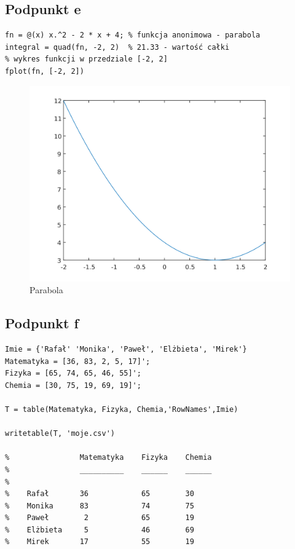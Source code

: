 \documentclass[a4paper, 12pt, titlepage]{article}
\begin{document}
        \subsection{Podpunkt e}
\begin{lstlisting}
fn = @(x) x.^2 - 2 * x + 4; % funkcja anonimowa - parabola
integral = quad(fn, -2, 2)  % 21.33 - wartość całki
% wykres funkcji w przedziale [-2, 2]
fplot(fn, [-2, 2])          
\end{lstlisting}
            \begin{figure}[H]
                \centering
                \includegraphics[width=0.8\columnwidth]{parabola.png}
                \caption{Parabola}
            \end{figure}\noindent

        \subsection{Podpunkt f}
\begin{lstlisting}
Imie = {'Rafał' 'Monika', 'Paweł', 'Elżbieta', 'Mirek'}
Matematyka = [36, 83, 2, 5, 17]';       
Fizyka = [65, 74, 65, 46, 55]';
Chemia = [30, 75, 19, 69, 19]';

T = table(Matematyka, Fizyka, Chemia,'RowNames',Imie)

writetable(T, 'moje.csv')

%                Matematyka    Fizyka    Chemia
%                __________    ______    ______
%
%    Rafał       36            65        30    
%    Monika      83            74        75    
%    Paweł        2            65        19    
%    Elżbieta     5            46        69    
%    Mirek       17            55        19    
\end{lstlisting}
\end{document}

